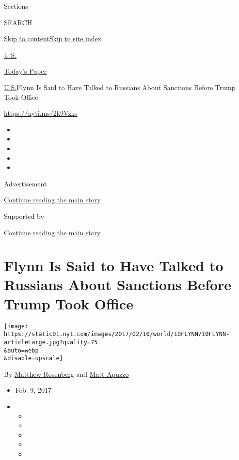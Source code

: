 Sections

SEARCH

\protect\hyperlink{site-content}{Skip to
content}\protect\hyperlink{site-index}{Skip to site index}

\href{https://www.nytimes.com/section/us}{U.S.}

\href{https://myaccount.nytimes.com/auth/login?response_type=cookie\&client_id=vi}{}

\href{https://www.nytimes.com/section/todayspaper}{Today's Paper}

\href{/section/us}{U.S.}\textbar{}Flynn Is Said to Have Talked to
Russians About Sanctions Before Trump Took Office

\url{https://nyti.ms/2k9Vzks}

\begin{itemize}
\item
\item
\item
\item
\item
\end{itemize}

Advertisement

\protect\hyperlink{after-top}{Continue reading the main story}

Supported by

\protect\hyperlink{after-sponsor}{Continue reading the main story}

\hypertarget{flynn-is-said-to-have-talked-to-russians-about-sanctions-before-trump-took-office}{%
\section{Flynn Is Said to Have Talked to Russians About Sanctions Before
Trump Took
Office}\label{flynn-is-said-to-have-talked-to-russians-about-sanctions-before-trump-took-office}}

\texttt{[image: https://static01.nyt.com/images/2017/02/10/world/10FLYNN/10FLYNN-articleLarge.jpg?quality=75\\\&auto=webp\\\&disable=upscale]}

By \href{http://www.nytimes.com/by/matthew-rosenberg}{Matthew Rosenberg}
and \href{http://www.nytimes.com/by/matt-apuzzo}{Matt Apuzzo}

\begin{itemize}
\item
  Feb. 9, 2017
\item
  \begin{itemize}
  \item
  \item
  \item
  \item
  \item
  \end{itemize}
\end{itemize}

